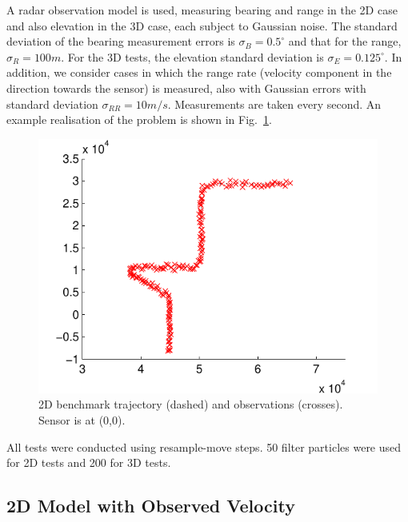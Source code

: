 \documentclass[conference]{IEEEtran}
\begin{document}
A radar observation model is used, measuring bearing and range in the 2D case and also elevation in the 3D case, each subject to Gaussian noise. The standard deviation of the bearing measurement errors is $\sigma_B = 0.5^{\circ}$ and that for the range, $\sigma_R = 100m$. For the 3D tests, the elevation standard deviation is $\sigma_E = 0.125^{\circ}$. In addition, we consider cases in which the range rate (velocity component in the direction towards the sensor) is measured, also with Gaussian errors with standard deviation $\sigma_{RR} = 10m/s$. Measurements are taken every second. An example realisation of the problem is shown in Fig.~\ref{fig:2D_ground_truth}.
%
\begin{figure}
\centering
\includegraphics[width=0.95\columnwidth]{images/benchmark_problem.pdf}
\caption{2D benchmark trajectory (dashed) and observations (crosses). Sensor is at (0,0).}
\label{fig:2D_ground_truth}
\end{figure}

All tests were conducted using resample-move steps. 50 filter particles were used for 2D tests and 200 for 3D tests.



\subsection{2D Model with Observed Velocity}
\end{document}
